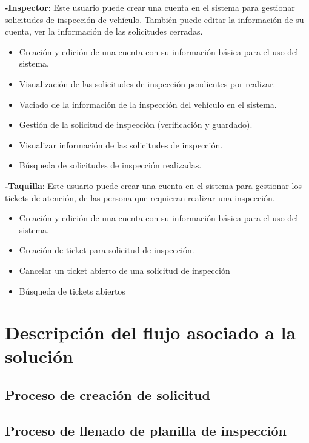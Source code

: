 \textbf{-Inspector}: Este usuario puede crear una cuenta en el sistema para gestionar solicitudes de inspección de vehículo. También puede editar la información de su cuenta, ver la información de las solicitudes cerradas. 
	\begin{itemize}
		\item Creación y edición de una cuenta con su información básica para el uso del sistema.
		\item Visualización de las solicitudes de inspección pendientes por realizar.
		\item Vaciado de la información de la inspección del vehículo en el sistema.
		\item Gestión de la solicitud de inspección (verificación y guardado). 
		\item Visualizar información de las solicitudes de inspección.
		\item Búsqueda de solicitudes de inspección realizadas.
	\end{itemize}

\textbf{-Taquilla}: Este usuario puede crear una cuenta en el sistema para gestionar los tickets de atención, de las persona que requieran realizar una inspección.
	\begin{itemize}
		\item Creación y edición de una cuenta con su información básica para el uso del sistema.
		\item Creación de ticket para solicitud de inspección.
		\item Cancelar un ticket abierto de una solicitud de inspección 
		\item Búsqueda de tickets abiertos
	\end{itemize}


\setlength{\parskip}{0mm}


\section{Descripción del flujo asociado a la solución} 
\setlength{\parskip}{5mm}
\setlength{\parskip}{0mm}

\subsection{Proceso de creación de solicitud}
\setlength{\parskip}{5mm}
\setlength{\parskip}{0mm}

\subsection{Proceso de llenado de planilla de inspección}
\setlength{\parskip}{5mm}
\setlength{\parskip}{0mm}

